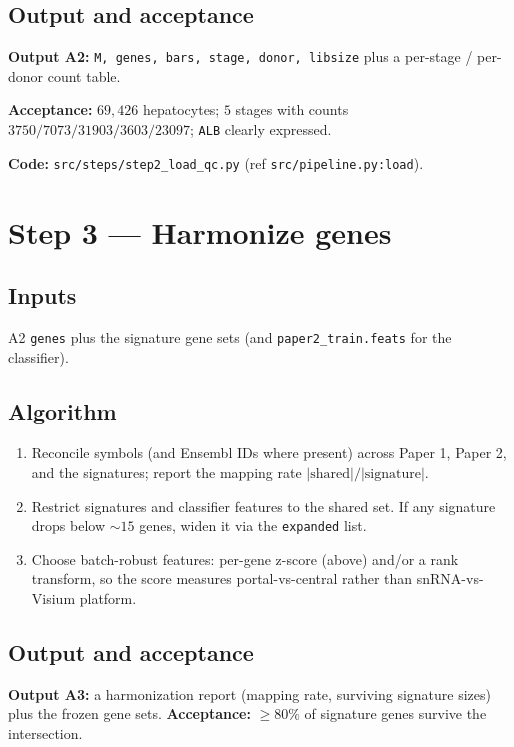 \documentclass[11pt]{article}
\newcommand{\code}[1]{\texttt{\small #1}}
\begin{document}
\subsection{Output and acceptance}
\textbf{Output A2:} \code{M, genes, bars, stage, donor, libsize} plus a per-stage / per-donor
count table.

\textbf{Acceptance:} $69{,}426$ hepatocytes; $5$ stages with counts
$3750 / 7073 / 31903 / 3603 / 23097$; \code{ALB} clearly expressed.

\medskip
\noindent\textbf{Code:} \code{src/steps/step2\_load\_qc.py} (ref \code{src/pipeline.py:load}).

\section{Step 3 --- Harmonize genes}

\subsection{Inputs}
A2 \code{genes} plus the signature gene sets (and \code{paper2\_train.feats} for the classifier).

\subsection{Algorithm}
\begin{enumerate}[leftmargin=1.6em]
  \item Reconcile symbols (and Ensembl IDs where present) across Paper 1, Paper 2, and the
        signatures; report the mapping rate $|\text{shared}| / |\text{signature}|$.
  \item Restrict signatures and classifier features to the shared set. If any signature drops
        below $\sim\!15$ genes, widen it via the \code{expanded} list.
  \item Choose batch-robust features: per-gene z-score (above) and/or a rank transform, so the
        score measures portal-vs-central rather than snRNA-vs-Visium platform.
\end{enumerate}

\subsection{Output and acceptance}
\textbf{Output A3:} a harmonization report (mapping rate, surviving signature sizes) plus the
frozen gene sets. \textbf{Acceptance:} $\ge 80\%$ of signature genes survive the intersection.
\end{document}

